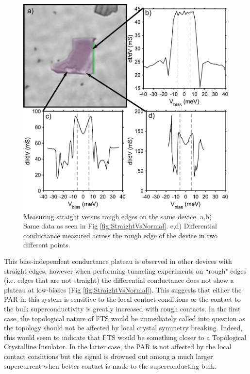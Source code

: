 \begin{figure}
	\centering
	\includegraphics[width=\textwidth]{Chap4/Figures/ControlFlake.pdf}
	\caption{Measuring straight versus rough edges on the same device. a,b) Same data as seen in Fig \ref{fig:StraightVsNormal}. c,d) Differential conductance measured across the rough edge of the device in two different points.}
	\label{fig:ControlDevice}
\end{figure}
This bias-independent conductance plateau is observed in other devices with straight edges, however when performing tunneling experiments on ``rough" edges (i.e. edges that are not straight) the differential conductance does not show a plateau at low-biases (Fig \ref{fig:StraightVsNormal}). This suggests that either the \ac{PAR} in this system is sensitive to the local contact conditions or the contact to the bulk superconductivity is greatly increased with rough contacts. In the first case, the topological nature of \ac{FTS} would be immediately called into question as the topology should not be affected by local crystal symmetry breaking. Indeed, this would seem to indicate that \ac{FTS} would be something closer to a Topological Crystalline Insulator. In the latter case, the \ac{PAR} is not affected by the local contact conditions but the signal is drowned out among a much larger supercurrent when better contact is made to the superconducting bulk.\par
